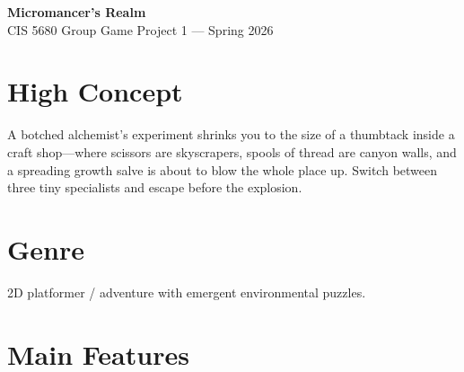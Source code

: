 \documentclass[11pt, letterpaper]{article}
\begin{document}
\begin{center}
    {\Large \textbf{Micromancer's Realm}}\\[2pt]
    {\small CIS 5680 Group Game Project 1 --- Spring 2026}
\end{center}

\vspace{-4pt}

\section*{High Concept}

A botched alchemist's experiment shrinks you to the size of a thumbtack inside a craft shop---where
scissors are skyscrapers, spools of thread are canyon walls, and a spreading growth salve is about
to blow the whole place up. Switch between three tiny specialists and escape before the explosion.

\section*{Genre}

2D platformer / adventure with emergent environmental puzzles.

\section*{Main Features}
\end{document}
